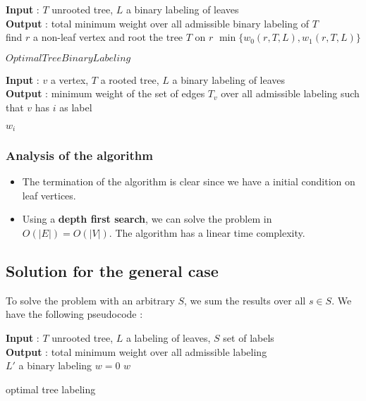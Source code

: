 \documentclass[letterpaper,12pt]{article}
\begin{document}
\begin{algorithm}[H]
\SetAlgoLined
\textbf{Input} : $T$ unrooted tree, $L$ a binary labeling of leaves \\
\textbf{Output} : total minimum weight over all admissible binary labeling of $T$\\
 find $r$ a non-leaf vertex and root the tree $T$ on $r$\;
 \Return $\min \{w_0(r, T, L), w_1(r, T, L)\}$\;
 \caption{$OptimalTreeBinaryLabeling$}
\end{algorithm}

\begin{algorithm}[H]
\SetAlgoLined
\textbf{Input} : $v$ a vertex, $T$ a rooted tree, $L$ a binary labeling of leaves \\
\textbf{Output} : minimum weight of the set of edges $T_v$ over all admissible labeling such that $v$ has $i$ as label\\
 \caption{$w_i$}
\end{algorithm}

\subsubsection{Analysis of the algorithm}

\begin{itemize}
    \item The termination of the algorithm is clear since we have a initial condition on leaf vertices.
    \item Using a \textbf{depth first search}, we can solve the problem in $O(|E|) = O(|V|)$. The algorithm has a linear time complexity.
\end{itemize}
\subsection{Solution for the general case}

To solve the problem with an arbitrary $S$, we sum the results over all $s \in S$. We have the following pseudocode :

\begin{algorithm}[H]
\SetAlgoLined
\textbf{Input} : $T$ unrooted tree, $L$ a labeling of leaves, $S$ set of labels \\
\textbf{Output} : total minimum weight over all admissible labeling\\
$L'$ a binary labeling\;
$w = 0$\;
 \Return $w$\;
 \caption{optimal tree labeling}
\end{algorithm}
\end{document}
